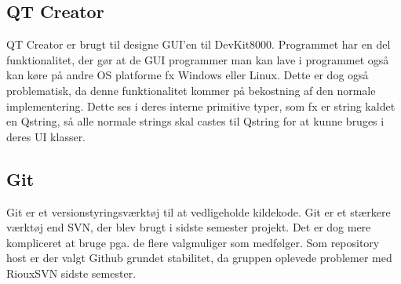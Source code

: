\subsection{QT Creator}
QT Creator er brugt til designe GUI'en til DevKit8000. Programmet har en del funktionalitet, der gør at de GUI programmer man kan lave i programmet også kan køre på andre OS platforme fx Windows eller Linux. Dette er dog også problematisk, da denne funktionalitet kommer på bekostning af den normale implementering. Dette ses i deres interne primitive typer, som fx er string kaldet en Qstring, så alle normale strings skal castes til Qstring for at kunne bruges i deres UI klasser.

\subsection{Git}
Git er et versionstyringsværktøj til at vedligeholde kildekode. 
Git er et stærkere værktøj end SVN, der blev brugt i sidste semester projekt. 
Det er dog mere kompliceret at bruge pga. de flere valgmuliger som medfølger. 
Som repository host er der valgt Github grundet stabilitet, da gruppen oplevede problemer med RiouxSVN sidste semester.

\clearpage